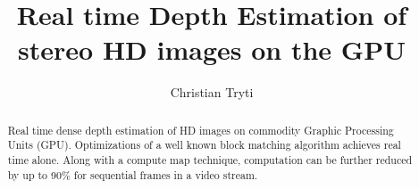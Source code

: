 \documentclass[twoside,openright,a4paper,12pt]{report}
\title{Real time Depth Estimation of stereo HD images on the GPU}
\author{Christian Tryti}
\date{} %
\begin{document}
\uiosloforside[kind=Master's Thesis]


\maketitle

\clearpage
{}

\begin{abstract}
  Real time dense depth estimation of HD images on commodity Graphic
  Processing Units (GPU). Optimizations of a well known block matching
  algorithm achieves real time alone. Along with a compute map
  technique, computation can be further reduced by up to 90\% for
  sequential frames in a video stream.
\end{abstract}

\tableofcontents{}
\listoffigures{}
\listoftables{}


\clearpage{}









\appendix







\end{document}
